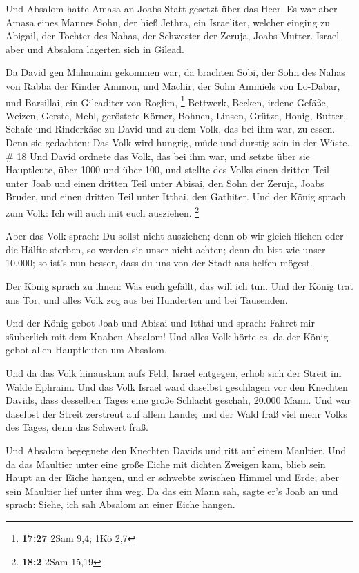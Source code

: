  Und Absalom hatte Amasa an Joabs Statt gesetzt über das
Heer. Es war aber Amasa eines Mannes Sohn, der hieß Jethra, ein
Israeliter, welcher einging zu Abigail, der Tochter des Nahas, der
Schwester der Zeruja, Joabs Mutter.  Israel aber und
Absalom lagerten sich in Gilead.

 Da David gen Mahanaim gekommen war, da brachten Sobi,
der Sohn des Nahas von Rabba der Kinder Ammon, und Machir, der Sohn
Ammiels von Lo-Dabar, und Barsillai, ein Gileaditer von Roglim,
\footnote{\textbf{17:27} 2Sam 9,4; 1Kö 2,7}  Bettwerk,
Becken, irdene Gefäße, Weizen, Gerste, Mehl, geröstete Körner, Bohnen,
Linsen, Grütze,  Honig, Butter, Schafe und Rinderkäse zu
David und zu dem Volk, das bei ihm war, zu essen. Denn sie gedachten:
Das Volk wird hungrig, müde und durstig sein in der Wüste. \# 18
 Und David ordnete das Volk, das bei ihm war, und setzte
über sie Hauptleute, über 1000 und über 100,  und stellte
des Volks einen dritten Teil unter Joab und einen dritten Teil unter
Abisai, den Sohn der Zeruja, Joabs Bruder, und einen dritten Teil unter
Itthai, den Gathiter. Und der König sprach zum Volk: Ich will auch mit
euch ausziehen. \footnote{\textbf{18:2} 2Sam 15,19}

 Aber das Volk sprach: Du sollst nicht ausziehen; denn ob
wir gleich fliehen oder die Hälfte sterben, so werden sie unser nicht
achten; denn du bist wie unser 10.000; so ist's nun besser, dass du uns
von der Stadt aus helfen mögest.

 Der König sprach zu ihnen: Was euch gefällt, das will ich
tun. Und der König trat ans Tor, und alles Volk zog aus bei Hunderten
und bei Tausenden.

 Und der König gebot Joab und Abisai und Itthai und
sprach: Fahret mir säuberlich mit dem Knaben Absalom! Und alles Volk
hörte es, da der König gebot allen Hauptleuten um Absalom.

 Und da das Volk hinauskam aufs Feld, Israel entgegen,
erhob sich der Streit im Walde Ephraim.  Und das Volk
Israel ward daselbst geschlagen vor den Knechten Davids, dass desselben
Tages eine große Schlacht geschah, 20.000 Mann.  Und war
daselbst der Streit zerstreut auf allem Lande; und der Wald fraß viel
mehr Volks des Tages, denn das Schwert fraß.

 Und Absalom begegnete den Knechten Davids und ritt auf
einem Maultier. Und da das Maultier unter eine große Eiche mit dichten
Zweigen kam, blieb sein Haupt an der Eiche hangen, und er schwebte
zwischen Himmel und Erde; aber sein Maultier lief unter ihm weg.
 Da das ein Mann sah, sagte er's Joab an und sprach:
Siehe, ich sah Absalom an einer Eiche hangen.

